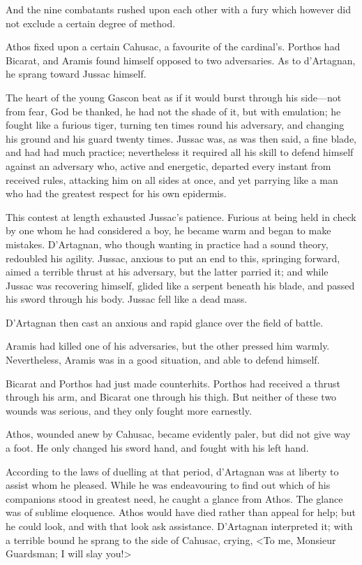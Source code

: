 And the nine combatants rushed upon each other with a fury which however did not exclude a certain degree of method. 

Athos fixed upon a certain Cahusac, a favourite of the cardinal's. Porthos had Bicarat, and Aramis found himself opposed to two adversaries. As to d'Artagnan, he sprang toward Jussac himself. 

The heart of the young Gascon beat as if it would burst through his side---not from fear, God be thanked, he had not the shade of it, but with emulation; he fought like a furious tiger, turning ten times round his adversary, and changing his ground and his guard twenty times. Jussac was, as was then said, a fine blade, and had had much practice; nevertheless it required all his skill to defend himself against an adversary who, active and energetic, departed every instant from received rules, attacking him on all sides at once, and yet parrying like a man who had the greatest respect for his own epidermis. 

This contest at length exhausted Jussac's patience. Furious at being held in check by one whom he had considered a boy, he became warm and began to make mistakes. D'Artagnan, who though wanting in practice had a sound theory, redoubled his agility. Jussac, anxious to put an end to this, springing forward, aimed a terrible thrust at his adversary, but the latter parried it; and while Jussac was recovering himself, glided like a serpent beneath his blade, and passed his sword through his body. Jussac fell like a dead mass. 

D'Artagnan then cast an anxious and rapid glance over the field of battle. 

Aramis had killed one of his adversaries, but the other pressed him warmly. Nevertheless, Aramis was in a good situation, and able to defend himself. 

Bicarat and Porthos had just made counterhits. Porthos had received a thrust through his arm, and Bicarat one through his thigh. But neither of these two wounds was serious, and they only fought more earnestly. 

Athos, wounded anew by Cahusac, became evidently paler, but did not give way a foot. He only changed his sword hand, and fought with his left hand. 

According to the laws of duelling at that period, d'Artagnan was at liberty to assist whom he pleased. While he was endeavouring to find out which of his companions stood in greatest need, he caught a glance from Athos. The glance was of sublime eloquence. Athos would have died rather than appeal for help; but he could look, and with that look ask assistance. D'Artagnan interpreted it; with a terrible bound he sprang to the side of Cahusac, crying, <To me, Monsieur Guardsman; I will slay you!> 

